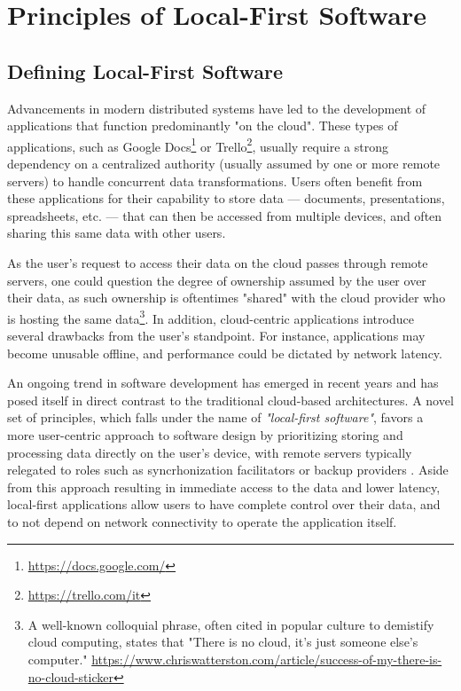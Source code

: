 \chapter{Principles of Local-First Software}

\section{Defining Local-First Software}
Advancements in modern distributed systems have led to the development of applications that
function predominantly "on the cloud". These types of applications, such as Google
Docs\footnote{\url{https://docs.google.com/}} or
Trello\footnote{\url{https://trello.com/it}}, usually require a strong dependency on a
centralized authority (usually assumed by one or more remote servers) to handle concurrent
data transformations. Users often benefit from these applications for their capability to
store data --- documents, presentations, spreadsheets, etc. --- that can then be accessed
from multiple devices, and often sharing this same data with other users.

As the user's request to access their data on the cloud passes through remote servers, one
could question the degree of ownership assumed by the user over their data, as such
ownership is oftentimes "shared" with the cloud provider who is hosting the same
data\footnote{
    A well-known colloquial phrase, often cited in popular culture to demistify cloud
    computing, states that "There is no cloud, it's just someone else's computer."
    \url{https://www.chriswatterston.com/article/success-of-my-there-is-no-cloud-sticker}
}. In addition, cloud-centric applications introduce several drawbacks from the user's
standpoint. For instance, applications may become unusable offline, and performance could be
dictated by network latency.

An ongoing trend in software development has emerged in recent years and has posed itself in
direct contrast to the traditional cloud-based architectures. A novel set of principles,
which falls under the name of \textit{"local-first software"}, favors a more user-centric
approach to software design by prioritizing storing and processing data directly on
the user's device, with remote servers typically relegated to roles such as syncrhonization
facilitators or backup providers \cite{kleppmann2019local}. Aside from this approach
resulting in immediate access to the data and lower latency, local-first applications allow
users to have complete control over their data, and to not depend on network connectivity to
operate the application itself.

